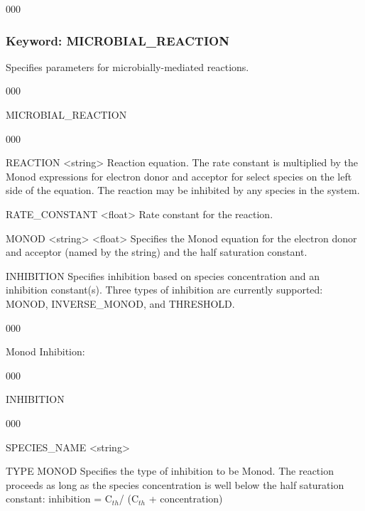 \begin{deflist}{000}
\hfill\hyperlink{target_key}{\return}

\clearpage
\protect\hypertarget{target_chem_micro}{}
\subsubsection{Keyword: MICROBIAL\_REACTION}
Specifies parameters for microbially-mediated reactions.

\hfill\hyperlink{target_key}{\return}

\begin{deflist}{000}
\item[MICROBIAL\_REACTION] ~

\begin{deflist}{000}
  \item [REACTION] <string> Reaction equation. The rate constant is multiplied by the Monod expressions for electron donor and acceptor for select species on the left side of the equation. The reaction may be inhibited by any species in the system.

  \item [RATE\_CONSTANT] <float>
Rate constant for the reaction.


  \item [MONOD] <string> <float>
Specifies the Monod equation for the electron donor and acceptor (named by the string) and the half saturation constant.

  \item [INHIBITION] Specifies inhibition based on species concentration and an inhibition constant(s). Three types of inhibition are currently supported: MONOD, \linebreak INVERSE\_MONOD, and THRESHOLD.

  \begin{deflist}{000}
    \item [Monod Inhibition:] ~

    \begin{deflist}{000}
      \item [INHIBITION] ~
      \begin{deflist}{000}
        \item [SPECIES\_NAME] <string>
        \item [TYPE MONOD] Specifies the type of inhibition to be Monod. The reaction proceeds as long as the species concentration is well below the half saturation constant: inhibition = C$_{th}$/ (C$_{th}$ + concentration)


\end{deflist}
\end{deflist}
\end{deflist}
\end{deflist}
\end{deflist}
\end{deflist}
